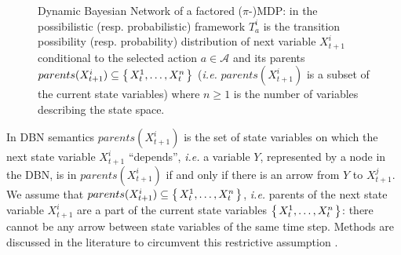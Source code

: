\begin{figure}
\caption[Dynamic Bayesian Network of a factored ($\pi$-)MDP]
{Dynamic Bayesian Network of a factored ($\pi$-)MDP:
in the possibilistic (resp. probabilistic) 
framework $T^i_a$ is the transition possibility (resp. probability) 
distribution of next variable $X^i_{t+1}$ conditional to
the selected action $a \in \mathcal{A}$
and its parents $parents(X^i_{t+1}) \subseteq \left\{ \left. X^1_t,\ldots,X^n_t \right. \right\}$
(\textit{i.e.} $parents(X^i_{t+1})$ is a subset of the current state variables)
where $n\geqslant1$ is the number of variables describing the state space.
}
\label{fig_piMDPFact}
\end{figure}
In DBN semantics 
$parents(X^i_{t+1})$ is the set of state variables on which the next state variable $X^i_{t+1}$ ``depends'',
\textit{i.e.} a variable $Y$, represented by a node in the DBN, 
is in $parents(X^i_{t+1})$ if and only if there is an arrow from $Y$ to $X^j_{t+1}$.
We assume that $parents(X^i_{t+1}) \subseteq \left\{ \left. X^1_t,\ldots,X^n_t \right. \right\}$,
\textit{i.e.} parents of the next state variable $X^i_{t+1}$
are a part of the current state variables $\left\{ \left. X^1_t,\ldots,X^n_t \right. \right\}$:
there cannot be any arrow between state variables of the same time step.
Methods are discussed in the literature to circumvent this restrictive assumption
\cite{DBLP:conf/uai/Boutilier97}. 


